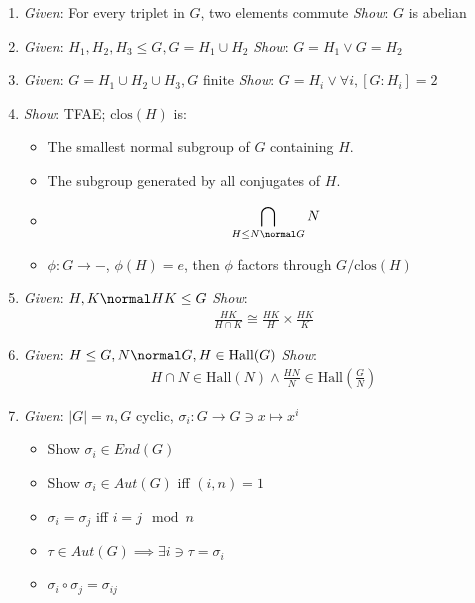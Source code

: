 \begin{enumerate}
\def\labelenumi{\arabic{enumi}.}
\item
  \emph{Given}: For every triplet in \(G\), two elements commute
  \emph{Show}: \(G\) is abelian
\item
  \emph{Given}: \(H_1, H_2, H_3 \leq G, G = H_1 \cup H_2\) \emph{Show}:
  \(G=H_1 \vee G=H_2\)
\item
  \emph{Given}: \(G=H_1 \cup H_2 \cup H_3, G\) finite \emph{Show}:
  \(G=H_i \vee \forall i, [G:H_i] = 2\)
\item
  \emph{Show}: TFAE; \(\text{clos}(H)\) is:

  \begin{itemize}
  \tightlist
  \item
    The smallest normal subgroup of \(G\) containing \(H\).
  \item
    The subgroup generated by all conjugates of \(H\).
  \item
    \begin{align*}\bigcap_{H \leq N \normal G} N\end{align*}
  \item
    \(\phi: G \rightarrow -\), \(\phi(H) = e\), then \(\phi\) factors
    through \(G/\text{clos}(H)\)
  \end{itemize}
\item
  \emph{Given}: \(H, K \normal HK \leq G\) \emph{Show}:
  \begin{align*} \frac{HK}{H\cap K} \cong \frac{HK}{H}\times \frac{HK}{K}\end{align*}
\item
  \emph{Given}: \(H\leq G, N \normal G, H \in \text{Hall}(G)\)
  \emph{Show}:
  \begin{align*}H\cap N \in \text{Hall}(N) \wedge \frac{HN}{N} \in \text{Hall}(\frac{G}{N})\end{align*}
\item
  \emph{Given}: \(|G| = n, G\) cyclic,
  \(\sigma_i: G \rightarrow G \ni x \mapsto x^i\)

  \begin{itemize}
  \tightlist
  \item
    Show \(\sigma_i \in End(G)\)
  \item
    Show \(\sigma_i \in Aut(G)\) iff \((i, n) = 1\)
  \item
    \(\sigma_i = \sigma_j\) iff \(i=j\mod n\)
  \item
    \(\tau \in Aut(G) \implies \exists i \ni \tau = \sigma_i\)
  \item
    \(\sigma_i \circ \sigma_j = \sigma_{ij}\)
  \end{itemize}


\end{enumerate}
